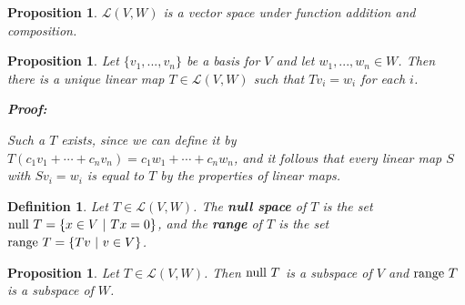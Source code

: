 \documentclass{article}
\theoremstyle{colontheorem}
\newtheorem{proposition}[theorem]{Proposition}
\newtheorem{definition}[theorem]{Definition}
\newcommand{\Null}{\textnormal{null }}
\newcommand{\Range}{\textnormal{range }}
\newenvironment{Proposition}
{
	\begin{mdframed}[backgroundcolor=TheoremOrange!10]
	\begin{proposition}
}
{
	\end{proposition}
	\end{mdframed}
	
	\vspace{.15in}
}
\newenvironment{Def}
{
	\begin{mdframed}[backgroundcolor=DefGreen!10]
	\begin{definition}
}
{
	\end{definition}
	\end{mdframed}
	
	\vspace{.15in}
}
\newenvironment{Proof}
{
	\begin{mdframed}[backgroundcolor=ProofPurple!10]
	\textbf{Proof:}%
}
{
	\end{mdframed}
	
	\vspace{.085in}
}
\begin{document}
\begin{Proposition}
	
	$\mathcal{L}(V, W)$ is a vector space under function addition and composition.
	
\end{Proposition}



\begin{Proposition}
	
	Let $\{v_1, ..., v_n\}$ be a basis for $V$ and let $w_1, ..., w_n \in W$. Then there is a unique linear map $T \in \mathcal{L}(V,W)$ such that $Tv_i = w_i$ for each $i$.
	
	\begin{Proof}
		Such a $T$ exists, since we can define it by $T(c_1 v_1 + \cdots + c_n v_n) = c_1 w_1 + \cdots + c_n w_n$, and it follows that every linear map $S$ with $Sv_i = w_i$ is equal to $T$ by the properties of linear maps.
		
	\end{Proof}
	
\end{Proposition}



\begin{Def}
	
	Let $T \in \mathcal{L}(V,W)$. The \textbf{null space} of $T$ is the set $\Null T = \{x \in V\ |\ Tx = 0\}$, and the \textbf{range} of $T$ is the set $\Range T = \{Tv\ |\ v \in V\}$.
	
\end{Def}



\begin{Proposition}
	
	Let $T \in \mathcal{L}(V,W)$. Then $\Null T$ is a subspace of $V$ and $\Range T$ is a subspace of $W$.
	
\end{Proposition}
\end{document}

